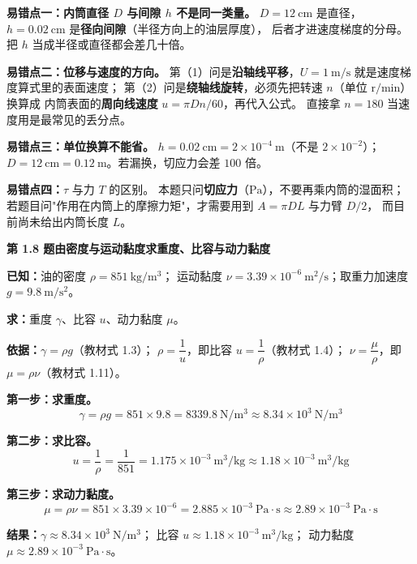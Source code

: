 \begin{yicuo}
\textbf{易错点一：内筒直径 $D$ 与间隙 $h$ 不是同一类量。}
$D=12\ \mathrm{cm}$ 是直径，$h=0.02\ \mathrm{cm}$ 是\textbf{径向间隙}（半径方向上的油层厚度），
后者才进速度梯度的分母。把 $h$ 当成半径或直径都会差几十倍。

\textbf{易错点二：位移与速度的方向。}
第（1）问是\textbf{沿轴线平移}，$U=1\ \mathrm{m/s}$ 就是速度梯度算式里的表面速度；
第（2）问是\textbf{绕轴线旋转}，必须先把转速 $n$（单位 $\mathrm{r/min}$）换算成
内筒表面的\textbf{周向线速度} $u=\pi Dn/60$，再代入公式。
直接拿 $n=180$ 当速度用是最常见的丢分点。

\textbf{易错点三：单位换算不能省。}
$h=0.02\ \mathrm{cm}=2\times10^{-4}\ \mathrm{m}$（不是 $2\times10^{-2}$）；
$D=12\ \mathrm{cm}=0.12\ \mathrm{m}$。若漏换，切应力会差 $100$ 倍。

\textbf{易错点四：}$\tau$ 与力 $T$ 的区别。
本题只问\textbf{切应力}（$\mathrm{Pa}$），不要再乘内筒的湿面积；
若题目问"作用在内筒上的摩擦力矩"，才需要用到 $A=\pi DL$ 与力臂 $D/2$，
而目前尚未给出内筒长度 $L$。
\end{yicuo}

\noindent\textbf{第 1.8 题\quad 由密度与运动黏度求重度、比容与动力黏度}

\begin{jie}
\textbf{已知：}油的密度 $\rho=851\ \mathrm{kg/m^3}$；
运动黏度 $\nu=3.39\times10^{-6}\ \mathrm{m^2/s}$；取重力加速度 $g=9.8\ \mathrm{m/s^2}$。

\textbf{求：}重度 $\gamma$、比容 $u$、动力黏度 $\mu$。

\textbf{依据：}$\gamma=\rho g$（教材式 1.3）；
$\rho=\dfrac{1}{u}$，即比容 $u=\dfrac{1}{\rho}$（教材式 1.4）；
$\nu=\dfrac{\mu}{\rho}$，即 $\mu=\rho\nu$（教材式 1.11）。

\textbf{第一步：求重度。}
\[ \gamma=\rho g=851\times9.8=8339.8\ \mathrm{N/m^3}
   \approx8.34\times10^{3}\ \mathrm{N/m^3} \]

\textbf{第二步：求比容。}
\[ u=\frac{1}{\rho}=\frac{1}{851}=1.175\times10^{-3}\ \mathrm{m^3/kg}
   \approx1.18\times10^{-3}\ \mathrm{m^3/kg} \]

\textbf{第三步：求动力黏度。}
\[ \mu=\rho\nu=851\times3.39\times10^{-6}
   =2.885\times10^{-3}\ \mathrm{Pa\cdot s}\approx2.89\times10^{-3}\ \mathrm{Pa\cdot s} \]

\textbf{结果：}$\gamma\approx8.34\times10^{3}\ \mathrm{N/m^3}$；
比容 $u\approx1.18\times10^{-3}\ \mathrm{m^3/kg}$；
动力黏度 $\mu\approx2.89\times10^{-3}\ \mathrm{Pa\cdot s}$。
\end{jie}

